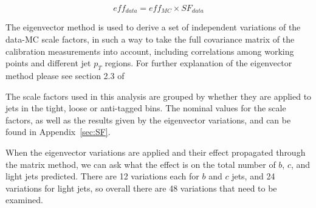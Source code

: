     \begin{equation}
        eff_{data}=eff_{MC}\times SF_{data}
    \end{equation}


The eigenvector method is used to derive a set of independent variations of the data-MC scale
factors, in such a way to take the full covariance matrix of the calibration measurements
into account, including correlations among working points and different jet $p_{T}$ regions.
For further explanation of the eigenvector method please see section 2.3 of%

The scale factors used in this analysis are grouped by whether they are applied to jets in the
tight, loose or anti-tagged bins.  The nominal values for the scale factors, as well as the results
given by the eigenvector variations, and can be found in Appendix~\ref{sec:SF}.

When the eigenvector variations are applied and their effect propagated through the matrix method,
we can ask what the effect is on the total number of $b$, $c$, and light jets predicted.
There are 12 variations each for $b$ and $c$ jets, and 24 variations for light jets, so
overall there are 48 variations that need to be examined.














